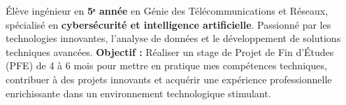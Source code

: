 
\begin{cvparagraph}

  Élève ingénieur en \textbf{5ᵉ année} en Génie des Télécommunications et Réseaux, spécialisé en \textbf{cybersécurité et intelligence artificielle}. Passionné par les technologies innovantes, l'analyse de données et le développement de solutions techniques avancées.
  \newline
  \textbf{Objectif :} Réaliser un stage de Projet de Fin d'Études (PFE) de 4 à 6 mois pour mettre en pratique mes compétences techniques, contribuer à des projets innovants et acquérir une expérience professionnelle enrichissante dans un environnement technologique stimulant.

\end{cvparagraph}
